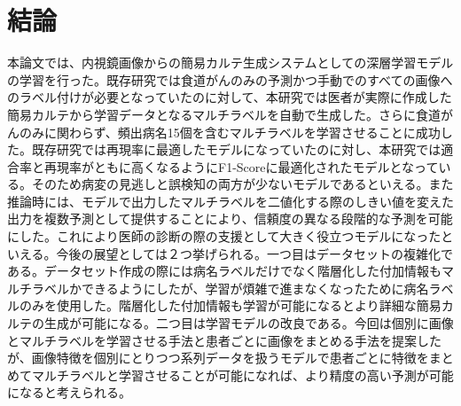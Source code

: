 \section{結論}
本論文では、内視鏡画像からの簡易カルテ生成システムとしての深層学習モデルの学習を行った。既存研究では食道がんのみの予測かつ手動でのすべての画像へのラベル付けが必要となっていたのに対して、本研究では医者が実際に作成した簡易カルテから学習データとなるマルチラベルを自動で生成した。さらに食道がんのみに関わらず、頻出病名15個を含むマルチラベルを学習させることに成功した。既存研究では再現率に最適したモデルになっていたのに対し、本研究では適合率と再現率がともに高くなるようにF1-Scoreに最適化されたモデルとなっている。そのため病変の見逃しと誤検知の両方が少ないモデルであるといえる。また推論時には、モデルで出力したマルチラベルを二値化する際のしきい値を変えた出力を複数予測として提供することにより、信頼度の異なる段階的な予測を可能にした。これにより医師の診断の際の支援として大きく役立つモデルになったといえる。今後の展望としては２つ挙げられる。一つ目はデータセットの複雑化である。データセット作成の際には病名ラベルだけでなく階層化した付加情報もマルチラベルかできるようにしたが、学習が煩雑で進まなくなったために病名ラベルのみを使用した。階層化した付加情報も学習が可能になるとより詳細な簡易カルテの生成が可能になる。二つ目は学習モデルの改良である。今回は個別に画像とマルチラベルを学習させる手法と患者ごとに画像をまとめる手法を提案したが、画像特徴を個別にとりつつ系列データを扱うモデルで患者ごとに特徴をまとめてマルチラベルと学習させることが可能になれば、より精度の高い予測が可能になると考えられる。
